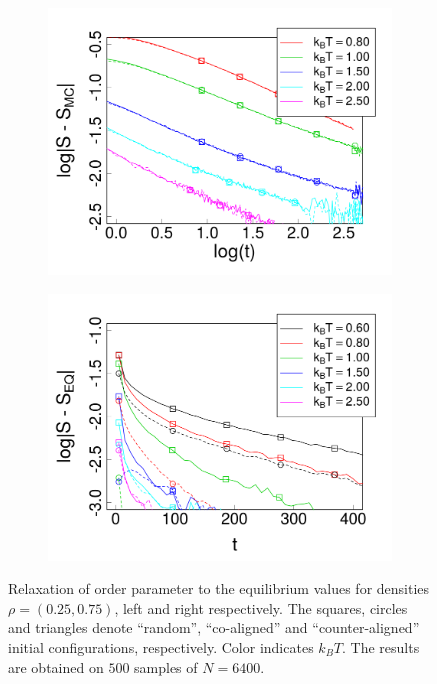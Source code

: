\begin{figure}[t]
\centering
\begin{subfigure}[t]{0.32\textwidth}
	\centering
	\includegraphics[width=\textwidth]{Images/relax_op_25}
\end{subfigure}
\begin{subfigure}[t]{0.32\textwidth}
	\centering
	\includegraphics[width=\textwidth]{Images/relax_op_75_exp}
\end{subfigure}
	\captionsetup{justification=centering, width=0.9\columnwidth}
	\caption{Relaxation of order parameter to the equilibrium values for densities $\rho = (0.25, 0.75)$, left and right respectively. The squares, circles and triangles denote ``random'', ``co-aligned'' and ``counter-aligned'' initial configurations, respectively. Color indicates $k_BT$. The results are obtained on $500$ samples of $N = 6400$.}
	\label{fig:op_relaxation}
\end{figure}

